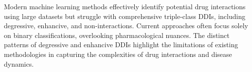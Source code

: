 \documentclass[unnumsec,webpdf,contemporary,large]{oup-authoring-template}%
\theoremstyle{thmstyleone}%
\theoremstyle{thmstyletwo}%
\theoremstyle{thmstylethree}%
\begin{document}


Modern machine learning methods effectively identify potential drug interactions using large datasets but struggle with comprehensive triple-class DDIs, including degressive, enhancive, and non-interactions. Current approaches often focus solely on binary classifications, overlooking pharmacological nuances. The distinct patterns of degressive and enhancive DDIs highlight the limitations of existing methodologies in capturing the complexities of drug interactions and disease dynamics.
\end{document}
